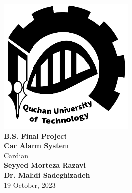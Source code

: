 \documentclass[a4paper,12pt]{report}
\renewcommand{\DTMtoday}{19 October, 2023}
\begin{document}
	\nocite{*}
	
	

	\newpage
	\begin{latin}
		\thispagestyle{empty}
		\centering
		\vspace*{5cm}
		\TNR
		\includegraphics[width=0.5\textwidth]{images/quct-logo.en.pdf}\\[8ex]
		\vspace*{5mm}
		\Large
		\textbf{B.S. Final Project}\\
		\vspace*{5mm}
		\Large
		\textbf{Car Alarm System}\\
		Cardian\\
		\vspace*{13mm}
		\large
		\textbf{Seyyed Morteza Razavi}\\
		\textbf{Dr. Mahdi Sadeghizadeh}\\
		\vspace*{5mm}
		\DTMtoday
	\end{latin}
\end{document}
